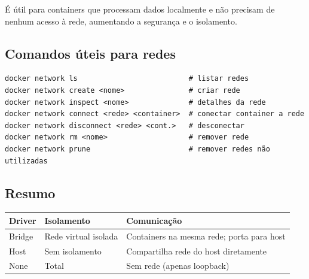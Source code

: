 É útil para containers que processam dados localmente e não precisam de nenhum acesso à rede, aumentando a segurança e o isolamento.

\subsection{Comandos úteis para redes}

\begin{verbatim}
docker network ls                          # listar redes
docker network create <nome>               # criar rede
docker network inspect <nome>              # detalhes da rede
docker network connect <rede> <container>  # conectar container a rede
docker network disconnect <rede> <cont.>   # desconectar
docker network rm <nome>                   # remover rede
docker network prune                       # remover redes não utilizadas
\end{verbatim}

\subsection{Resumo}

\begin{center}
\begin{tabular}{|l|l|l|}
\hline
\textbf{Driver} & \textbf{Isolamento} & \textbf{Comunicação} \\
\hline
Bridge & Rede virtual isolada & Containers na mesma rede; porta para host \\
Host & Sem isolamento & Compartilha rede do host diretamente \\
None & Total & Sem rede (apenas loopback) \\
\hline
\end{tabular}
\end{center}
